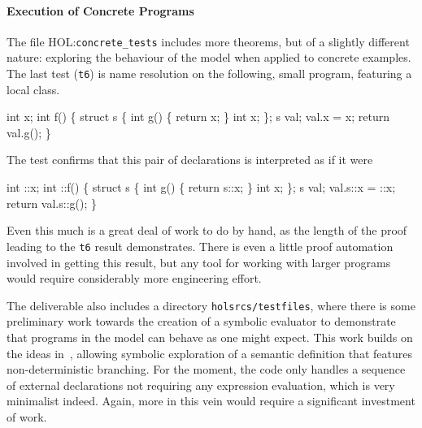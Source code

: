 \documentclass[11pt]{article}
\newcommand{\HOLfile}[1]{HOL:\texttt{#1}}
\begin{document}
\paragraph{Execution of Concrete Programs}
The file \HOLfile{concrete_tests} includes more theorems, but of a
slightly different nature: exploring the behaviour of the model when
applied to concrete examples.   The
last test (\texttt{t6}) is name resolution on the following, small
program, featuring a local class.
\begin{stdrule}
   int x;
   int f()
   \{
     struct s \{
       int g() \{ return x; \}
       int x;
     \};
     s val;
     val.x = x;
     return val.g();
   \}
\end{stdrule}
The test confirms that this pair of declarations is interpreted as if
it were
\begin{stdrule}
   int ::x;
   int ::f()
   \{
     struct s \{
       int g() \{ return s::x; \}
       int x;
     \};
     s val;
     val.s::x = ::x;
     return val.s::g();
   \}
\end{stdrule}
Even this much is a great deal of work to do by hand, as the length of
the proof leading to the \texttt{t6} result demonstrates.  There is
even a little proof automation involved in getting this result, but
any tool for working with larger programs would require considerably
more engineering effort.

The deliverable also includes a directory \texttt{holsrcs/testfiles},
where there is some preliminary work towards the creation of a
symbolic evaluator to demonstrate that programs in the model can
behave as one might expect.  This work builds on the ideas
in~\cite{netsem:popl2006}, allowing symbolic exploration of a semantic
definition that features non-deterministic branching.  For the moment,
the code only handles a sequence of external declarations not
requiring any expression evaluation, which is very minimalist indeed.
Again, more in this vein would require a significant investment of
work.
\end{document}
